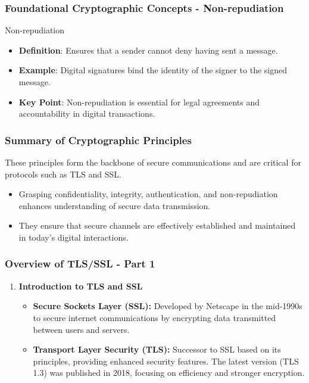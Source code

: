 \documentclass{beamer}
\begin{document}
\begin{frame}[fragile]
    \frametitle{Foundational Cryptographic Concepts - Non-repudiation}
    \begin{block}{Non-repudiation}
        \begin{itemize}
            \item \textbf{Definition}: Ensures that a sender cannot deny having sent a message.
            \item \textbf{Example}: Digital signatures bind the identity of the signer to the signed message.
            \item \textbf{Key Point}: Non-repudiation is essential for legal agreements and accountability in digital transactions.
        \end{itemize}
    \end{block}
\end{frame}

\begin{frame}[fragile]
    \frametitle{Summary of Cryptographic Principles}
    These principles form the backbone of secure communications and are critical for protocols such as TLS and SSL.
    \begin{itemize}
        \item Grasping confidentiality, integrity, authentication, and non-repudiation enhances understanding of secure data transmission.
        \item They ensure that secure channels are effectively established and maintained in today’s digital interactions.
    \end{itemize}
\end{frame}

\begin{frame}[fragile]
    \frametitle{Overview of TLS/SSL - Part 1}
    \begin{enumerate}
        \item \textbf{Introduction to TLS and SSL}
            \begin{itemize}
                \item \textbf{Secure Sockets Layer (SSL):} Developed by Netscape in the mid-1990s to secure internet communications by encrypting data transmitted between users and servers.
                \item \textbf{Transport Layer Security (TLS):} Successor to SSL based on its principles, providing enhanced security features. The latest version (TLS 1.3) was published in 2018, focusing on efficiency and stronger encryption.
            \end{itemize}
    \end{enumerate}
\end{frame}
\end{document}
